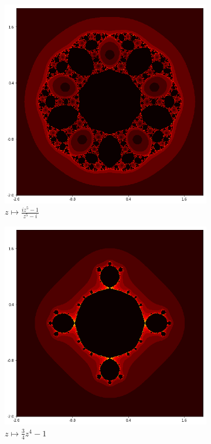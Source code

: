 \documentclass{amsart}
\theoremstyle{definition}
\theoremstyle{remark}
\numberwithin{equation}{section}
\begin{document}
\begin{figure}[h]
\begin{subfigure}{.32\textwidth}
  \includegraphics[width=.8\linewidth]{JuliaFunky2.png}
  \caption{$z\mapsto \frac{iz^5-1}{z^5-i}$}
\end{subfigure}
\begin{subfigure}{.32\textwidth}
  \centering
  \includegraphics[width=.8\linewidth]{Julia075z4minus1.png}
  \caption{$z\mapsto \frac{3}{4}z^4-1$}
\end{subfigure}
\begin{subfigure}{.32\textwidth}
  \centering

\end{subfigure}
\end{figure}
\end{document}
